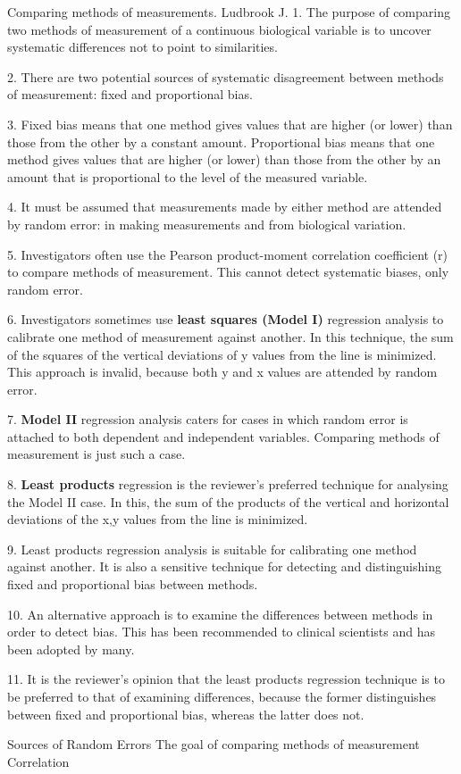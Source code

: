 Comparing methods of measurements.
Ludbrook J.
1. The purpose of comparing two methods of measurement of a continuous biological variable is to uncover systematic 
differences not to point to similarities. 

2. There are two potential sources of systematic disagreement between methods of measurement: fixed and 
proportional bias. 

3. Fixed bias means that one method gives values that are higher (or lower) than those from the other by a constant amount. Proportional bias means that one method gives values that are higher (or lower) than those from the 
other by an amount that is proportional to the level of the measured variable. 

4. It must be assumed that measurements made by either method are attended by random error: in making measurements and from biological variation. 

5. Investigators often use the Pearson product-moment correlation coefficient (r) to compare methods of measurement. 
This cannot detect systematic biases, only random error. 

6. Investigators sometimes use \textbf{least squares (Model I)} regression analysis to calibrate one method of measurement against 
another. In this technique, the sum of the squares of the vertical deviations of y values from the line is minimized. 
This approach is invalid, because both y and x values are attended by random error. 

7. \textbf{Model II} regression analysis caters for cases in which random error is attached to both dependent and independent 
variables. Comparing methods of measurement is just such a case. 

8. \textbf{Least products} regression is the reviewer's preferred technique for analysing the Model II case. In this, the sum of 
the products of the vertical and horizontal deviations of the x,y values from the line is minimized. 

9. Least products regression analysis is suitable for calibrating one method against another. It is also a sensitive 
technique for detecting and distinguishing fixed and proportional bias between methods. 

10. An alternative approach is to examine the differences between methods in order to detect bias. 
This has been recommended to clinical scientists and has been adopted by many. 

11. It is the reviewer's opinion that the least products regression technique is to be preferred to that of examining differences, because the 
former distinguishes between fixed and proportional bias, whereas the latter does not.

Sources of Random Errors
The goal of comparing methods of measurement
Correlation

